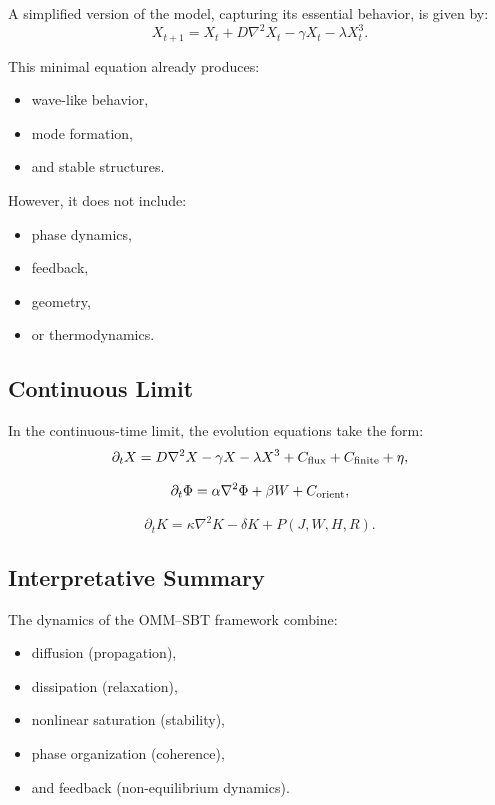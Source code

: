 \documentclass[11pt]{article}
\begin{document}
A simplified version of the model, capturing its essential behavior, is given by:
\begin{equation}
X_{t+1}
=
X_t
+ D \nabla^2 X_t
- \gamma X_t
- \lambda X_t^3.
\end{equation}

This minimal equation already produces:
\begin{itemize}
\item wave-like behavior,
\item mode formation,
\item and stable structures.
\end{itemize}

However, it does not include:
\begin{itemize}
\item phase dynamics,
\item feedback,
\item geometry,
\item or thermodynamics.
\end{itemize}

\subsection{Continuous Limit}

In the continuous-time limit, the evolution equations take the form:
\begin{equation}
\partial_t X
=
D \nabla^2 X
- \gamma X
- \lambda X^3
+ C_{\rm flux}
+ C_{\rm finite}
+ \eta,
\end{equation}

\begin{equation}
\partial_t \Phi
=
\alpha \nabla^2 \Phi
+ \beta W
+ C_{\rm orient},
\end{equation}

\begin{equation}
\partial_t K
=
\kappa \nabla^2 K
- \delta K
+ P(J,W,H,R).
\end{equation}

\subsection{Interpretative Summary}

The dynamics of the OMM--SBT framework combine:

\begin{itemize}
\item diffusion (propagation),
\item dissipation (relaxation),
\item nonlinear saturation (stability),
\item phase organization (coherence),
\item and feedback (non-equilibrium dynamics).
\end{itemize}
\end{document}

